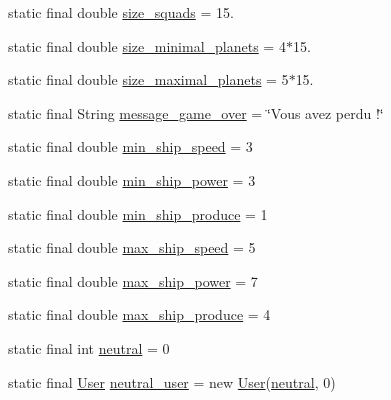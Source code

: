 \begin{DoxyCompactItemize}
\item 
static final double \hyperlink{classfr_1_1projet_1_1groupe40_1_1util_1_1_constantes_ac4454baf5e684c8ef11e176811ca6539}{size\+\_\+squads} = 15.
\item 
static final double \hyperlink{classfr_1_1projet_1_1groupe40_1_1util_1_1_constantes_ac93ce3978ee87e29e3200e70979bb319}{size\+\_\+minimal\+\_\+planets} = 4$\ast$15.
\item 
static final double \hyperlink{classfr_1_1projet_1_1groupe40_1_1util_1_1_constantes_aac4e976050df9b797db436ae156e13d8}{size\+\_\+maximal\+\_\+planets} = 5$\ast$15.
\item 
static final String \hyperlink{classfr_1_1projet_1_1groupe40_1_1util_1_1_constantes_a0ff9ae0397add21964b151cce6797fc9}{message\+\_\+game\+\_\+over} = \char`\"{}Vous avez perdu !\char`\"{}
\item 
static final double \hyperlink{classfr_1_1projet_1_1groupe40_1_1util_1_1_constantes_afc47053a18e107cf5725370809e30e9d}{min\+\_\+ship\+\_\+speed} = 3
\item 
static final double \hyperlink{classfr_1_1projet_1_1groupe40_1_1util_1_1_constantes_ac4190be1e9ede5f53c2c42328c53ed17}{min\+\_\+ship\+\_\+power} = 3
\item 
static final double \hyperlink{classfr_1_1projet_1_1groupe40_1_1util_1_1_constantes_ad6c52112c41d45f09b870da6c8183b7e}{min\+\_\+ship\+\_\+produce} = 1
\item 
static final double \hyperlink{classfr_1_1projet_1_1groupe40_1_1util_1_1_constantes_a308c37932d74f10d92367ccee5d6bc01}{max\+\_\+ship\+\_\+speed} = 5
\item 
static final double \hyperlink{classfr_1_1projet_1_1groupe40_1_1util_1_1_constantes_a2cf63e838bac482024489651ad5da853}{max\+\_\+ship\+\_\+power} = 7
\item 
static final double \hyperlink{classfr_1_1projet_1_1groupe40_1_1util_1_1_constantes_ac42829dfbb6a03d90d8445927dfb4458}{max\+\_\+ship\+\_\+produce} = 4
\item 
static final int \hyperlink{classfr_1_1projet_1_1groupe40_1_1util_1_1_constantes_a0569bd6ddee74127e4a8ec59890ea79a}{neutral} = 0
\item 
static final \hyperlink{classfr_1_1projet_1_1groupe40_1_1client_1_1_user}{User} \hyperlink{classfr_1_1projet_1_1groupe40_1_1util_1_1_constantes_af483735d1c6a1f063f02657d52d3bd4c}{neutral\+\_\+user} = new \hyperlink{classfr_1_1projet_1_1groupe40_1_1client_1_1_user}{User}(\hyperlink{classfr_1_1projet_1_1groupe40_1_1util_1_1_constantes_a0569bd6ddee74127e4a8ec59890ea79a}{neutral}, 0)

\end{DoxyCompactItemize}
